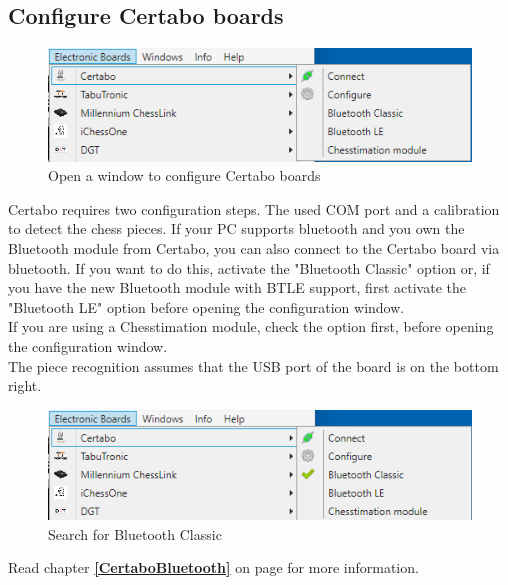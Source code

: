 \documentclass[11pt,a4paper]{article}
\begin{document}
\subsection{Configure Certabo boards} \label{ConfigureCertabo}
\begin{figure}[H]
	\centering
	\includegraphics[scale=0.9]{Certabo1.png}
	\caption{Open a window to configure Certabo boards }
	\label{fig:Certabo1}
\end{figure}

Certabo requires two configuration steps. The used COM port and a calibration to detect the chess pieces. If your PC supports bluetooth and you own the Bluetooth module from Certabo, you can also connect to the Certabo board via bluetooth. If you want to do this, activate the "Bluetooth Classic" option or, if you have the new Bluetooth module with BTLE support, first activate the "Bluetooth LE" option before opening the configuration window.\\
If you are using a Chesstimation module, check the option first, before opening the configuration window.\\
The piece recognition assumes that the USB port of the board is on the bottom right.

\begin{figure}[H]
	\centering
	\includegraphics[scale=0.9]{Certabo6.png}
	\caption{Search for Bluetooth Classic}
	\label{fig:Certabo6}
\end{figure}

Read chapter \textbf{\ref{CertaboBluetooth}  } on page \pageref{CertaboBluetooth} for more information.
\end{document}
